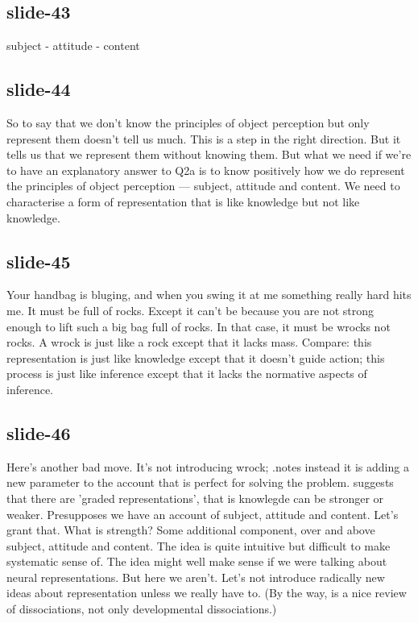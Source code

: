 \documentclass[12pt,\papersize]{extarticle}
\begin{document}
 
\subsection{slide-43}
subject - attitude - content
 
 
\subsection{slide-44}
So to say that we don't know the principles of object perception but only represent them doesn't tell us much.
This is a step in the right direction.
But it tells us that we represent them without knowing them.
But what we need if we're to have an explanatory answer to Q2a is to know positively how we do represent the principles of object perception --- subject, attitude and content.
We need to characterise a form of representation that is like knowledge but not like knowledge.
 
 
\subsection{slide-45}
Your handbag is bluging, and when you swing it at me something really hard hits me.
It must be full of rocks.
Except it can't be because you are not strong enough to lift such a big bag full of rocks.
In that case, it must be wrocks not rocks.
A wrock is just like a rock except that it lacks mass.
Compare: this representation is just like knowledge except that it doesn't guide action; this process is just like inference except that it lacks the normative aspects of inference.
 
 
\subsection{slide-46}
Here's another bad move. It's not introducing wrock; .notes instead it is adding a new parameter to the account that is perfect for solving the problem.
\citet{Munakata:2001ch} suggests that there are 'graded representations', that is knowlegde can be stronger or weaker.
Presupposes we have an account of subject, attitude and content. Let's grant that.
What is strength? Some additional component, over and above subject, attitude and content.
The idea is quite intuitive but difficult to make systematic sense of.
The idea might well make sense if we were talking about neural representations.
But here we aren't. Let's not introduce radically new ideas about representation unless we really have to.
(By the way, \citet{Munakata:2001ch} is a nice review of dissociations, not only developmental dissociations.)
 
\end{document}
